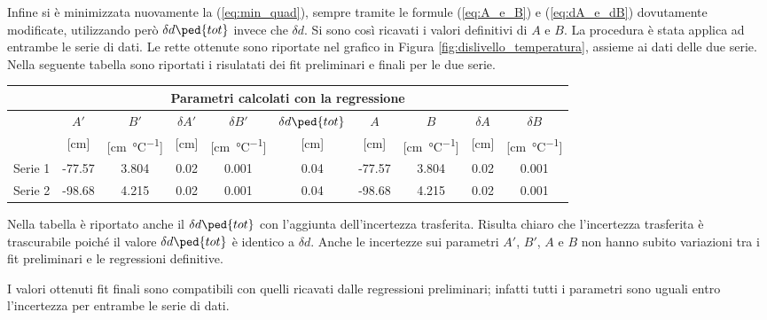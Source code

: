 Infine si è minimizzata nuovamente la (\ref{eq:min_quad}), sempre tramite le formule (\ref{eq:A_e_B}) e (\ref{eq:dA_e_dB})
dovutamente modificate, utilizzando però $\delta d\ped{tot}$ invece che $\delta d$.
%
Si sono così ricavati i valori definitivi di $A$ e $B$. La procedura è stata applica ad entrambe le serie di dati.
Le rette ottenute sono riportate nel grafico in Figura \ref{fig:dislivello_temperatura}, assieme ai dati delle due serie.
Nella seguente tabella sono riportati i risulatati dei fit preliminari e finali per le due serie.

\begin{center}
    \small
    \begin{tabular}{l c c c c c | c c c c}
        \multicolumn{10}{c}{\textbf{Parametri calcolati con la regressione}} \\
        \toprule
        & $A'$ & $B'$ & $\delta A'$ & $\delta B'$ &
        $\delta d\ped{tot}$ & $A$ & $B$ & $\delta A$ & $\delta B$ \\
        & [cm] & [\si{\centi\meter\per\celsius}] & [cm] & [\si{\centi\meter\per\celsius}] &
        [cm] & [cm] & [\si{\centi\meter\per\celsius}] & [cm] & [\si{\centi\meter\per\celsius}] \\
        \midrule
        Serie 1 & -77.57 & 3.804 & 0.02 & 0.001 & 0.04 & -77.57 & 3.804 & 0.02 & 0.001 \\
        Serie 2 & -98.68 & 4.215 & 0.02 & 0.001 & 0.04 & -98.68 & 4.215 & 0.02 & 0.001 \\
        \bottomrule
    \end{tabular}
\end{center}

Nella tabella è riportato anche il $\delta d\ped{tot}$ con l'aggiunta dell'incertezza trasferita. Risulta chiaro che l'incertezza trasferita è
trascurabile poiché il valore $\delta d\ped{tot}$ è identico a $\delta d$. Anche le incertezze sui parametri $A'$, $B'$, $A$ e $B$
non hanno subito variazioni tra i fit preliminari e le regressioni definitive.

I valori ottenuti fit finali sono compatibili con quelli ricavati dalle regressioni preliminari; infatti tutti i parametri
sono uguali entro l'incertezza per entrambe le serie di dati.
